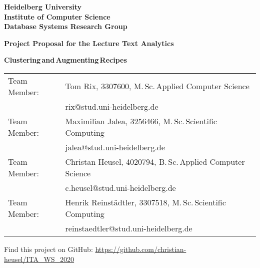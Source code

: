\documentclass[
     12pt,         %
     a4paper,      %
     BCOR10mm,     %
     DIV14,        %
     ]{article}
\begin{document}
\begin{titlepage}


\vspace*{1cm}
\begin{center}
\vspace*{3cm}
\textbf{
\Large Heidelberg University\\
\smallskip
\Large Institute of Computer Science\\
\smallskip
\Large Database Systems Research Group\\
\smallskip
}

\vspace{3cm}

\textbf{\large Project Proposal for the Lecture Text Analytics}

\vspace{0.5\baselineskip}
{\huge
\textbf{Clustering\,and\,Augmenting\,Recipes}
}
\end{center}

\vfill

{
    \hspace{-7mm}
\begin{tabular}[l]{ll}
    Team Member: & Tom Rix, 3307600, M.\,Sc.\,Applied Computer Science \\
                 & rix@stud.uni-heidelberg.de \\
    Team Member: & Maximilian Jalea, 3256466, M.\,Sc.\,Scientific Computing \\
                 & jalea@stud.uni-heidelberg.de\\
    Team Member: & Christan Heusel, 4020794, B.\,Sc.\,Applied Computer Science \\
                 & c.heusel@stud.uni-heidelberg.de \\
    Team Member: & Henrik Reinstädtler, 3307518, M.\,Sc.\,Scientific Computing \\
                 & reinstaedtler@stud.uni-heidelberg.de \\


\end{tabular}
}

\vspace{1cm}
\large \centering {} Find this project on GitHub: \url{https://github.com/christian-heusel/ITA_WS_2020}

\end{titlepage}
\end{document}
